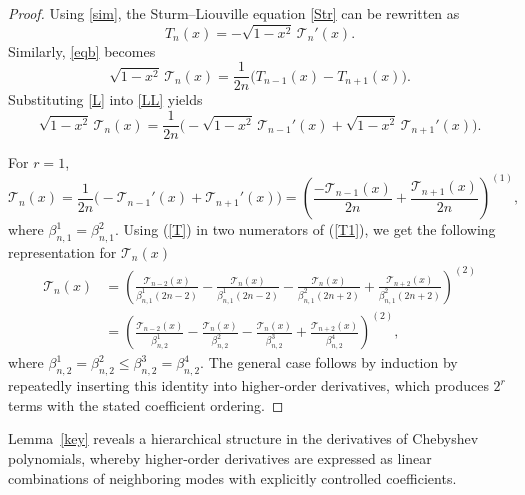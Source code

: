 \documentclass[12pt,a4paper]{article}
\begin{document}
\begin{proof}
    Using \eqref{sim}, the Sturm--Liouville equation \eqref{Str} can be rewritten as
    \begin{equation}\label{L}
    T_n(x)=-\sqrt{1-x^2}\,\mathcal{T}_n'(x).
    \end{equation}
    Similarly, \eqref{eqb} becomes
    \begin{equation}\label{LL}
    \sqrt{1-x^2}\,\mathcal{T}_n(x)
    =\frac{1}{2n}\bigl(T_{n-1}(x)-T_{n+1}(x)\bigr).
    \end{equation}
    Substituting \eqref{L} into \eqref{LL} yields
    \begin{equation}\label{T}
    \sqrt{1-x^2}\,\mathcal{T}_n(x)
    =\frac{1}{2n}\bigl(-\sqrt{1-x^2}\,\mathcal{T}_{n-1}'(x)
    +\sqrt{1-x^2}\,\mathcal{T}_{n+1}'(x)\bigr).
    \end{equation}
    
    For $r=1$,
    \begin{equation}\label{T1}
    \mathcal{T}_n(x)
    =\frac{1}{2n}\bigl(-\mathcal{T}_{n-1}'(x)+\mathcal{T}_{n+1}'(x)\bigr)
    =\left(\frac{-\mathcal{T}_{n-1}(x)}{2n}
    +\frac{\mathcal{T}_{n+1}(x)}{2n}\right)^{(1)},
    \end{equation}
    where $\beta^1_{n,1}=\beta^2_{n,1}.$ Using (\ref{T}) in two numerators of (\ref{T1}), we get the following representation for $\mathcal{T}_n(x)$
    \begin{align}\label{comb2}
    \mathcal{T}_n(x)&=\left(\frac{\mathcal{T}_{n-2}(x)}{\beta^1_{n,1}(2n-2)}-\frac{\mathcal{T}_{n}(x)}{\beta^1_{n,1}(2n-2)}
    -\frac{\mathcal{T}_{n}(x)}{\beta^2_{n,1}(2n+2)}+\frac{\mathcal{T}_{n+2}(x)}{\beta^2_{n,1}(2n+2)}\right)^{(2)}\nonumber\\
    &=\left(\frac{\mathcal{T}_{n-2}(x)}{\beta^1_{n,2}}-\frac{\mathcal{T}_{n}(x)}{\beta^2_{n,2}}
    -\frac{\mathcal{T}_{n}(x)}{\beta^3_{n,2}}+\frac{\mathcal{T}_{n+2}(x)}{\beta^4_{n,2}}\right)^{(2)},
    \end{align}
    where $\beta^1_{n,2}=\beta^2_{n,2}\leq \beta^3_{n,2}=\beta^4_{n,2} .$
    The general case follows by induction by repeatedly inserting this identity into
    higher-order derivatives, which produces $2^r$ terms with the stated coefficient
    ordering.
\end{proof}

Lemma~\ref{key} reveals a hierarchical structure in the derivatives of Chebyshev
polynomials, whereby higher-order derivatives are expressed as linear combinations
of neighboring modes with explicitly controlled coefficients.
\end{document}
